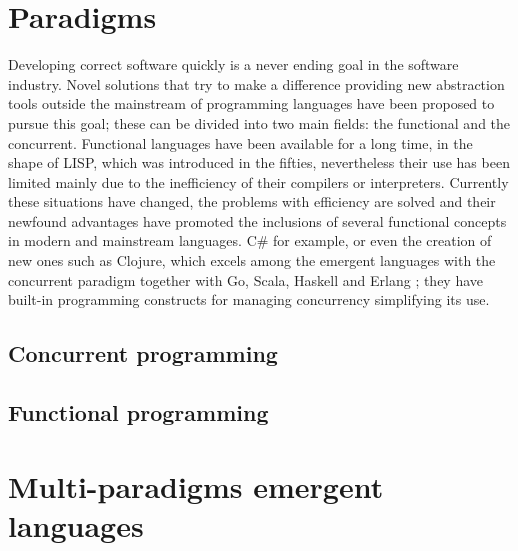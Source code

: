 \documentclass[a4paper]{llncs}
\begin{document}
\section{Paradigms}
\label{sec:paradigmas}

Developing correct software quickly is a never ending goal in the
software industry. Novel solutions that try to make a difference
providing new abstraction tools outside the mainstream of
programming languages have been
proposed to pursue this goal;  these can be divided into two main
fields: the functional and the concurrent. Functional languages have been
available for a long time, in the shape of LISP, which was introduced
in the fifties, 
nevertheless their use has been limited mainly due to the inefficiency of
their compilers or interpreters. Currently these situations have
changed, the problems with efficiency are solved and their newfound advantages have promoted the
inclusions of several functional concepts in modern and mainstream
languages. C\# for example, or even the creation of new ones
such as Clojure, which excels among the emergent languages with the
concurrent paradigm together with Go, Scala, Haskell and Erlang
\cite{DiPierro:2012:CMP}; they have built-in programming constructs
for managing concurrency simplifying its use.



\subsection{Concurrent programming}
    

\subsection{Functional programming}
    

\section{Multi-paradigms emergent languages}
\label{sec:emergentes}
    

%    
%
%    
%
%    
\end{document}
